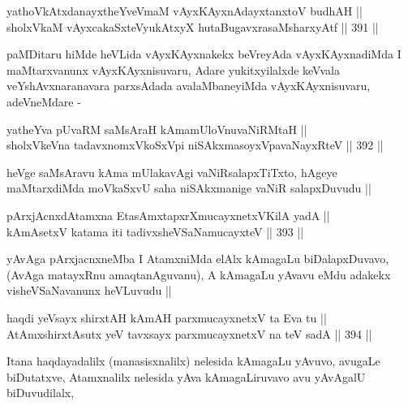 
\begin{shl}
yathoVkAtxdanayxtheYveVmaM vAyxKAyxnAdayxtanxtoV budhAH ||  \\
sholxVkaM vAyxcakaSxteV\s yukAtxyX hutaBugavxrasaMsharxyAtf ||  391 ||  
\end{shl}

\begin{artha}
paMDitaru hiMde heVLida vAyxKAyxnakekx beVreyAda vAyxKAyxnadiMda I
maMtarxvanunx vAyxKAyxnisuvaru, Adare yukitxyilalxde keVvala
veYshAvxnaranavara parxsAdada avalaMbaneyiMda vAyxKAyxnisuvaru, adeVneMdare  -
\end{artha}

\begin{shl}
yatheYva pUvaRM saMsAraH kAmamUloV\s nuvaNiRMtaH || \\
sholxVkeVna tadavxnomxVkoSxV\s pi niSAkxmasoyxVpavaNayxRteV ||  392 ||  
\end{shl}

\begin{artha}
heVge saMsAravu kAma mUlakavAgi vaNiRsalapxTiTxto, hAgeye maMtarxdiMda
moVkaSxvU saha niSAkxmanige vaNiR salapxDuvudu ||
\end{artha}


\begin{shl}
pArxjAcnxdAtamxna EtasAmxtapxrXmucayxnetxV\s KilA yadA || \\
kAmAsetxV katama iti tadivxsheVSaNamucayxteV ||  393 ||  
\end{shl}

\begin{artha}
yAvAga pArxjacnxneMba I AtamxniMda elAlx kAmagaLu biDalapxDuvavo,
(AvAga matayxRnu amaqtanAguvanu), A kAmagaLu yAvavu eMdu adakekx
visheVSaNavanunx heVLuvudu || 
\end{artha}


\begin{shl}
haqdi yeV\s sayx shirxtAH kAmAH parxmucayxnetxV ta Eva tu || \\
AtAmxshirxtAsutx yeV tavxsayx parxmucayxnetxV na teV sadA ||  394 ||  
\end{shl}

\begin{artha}
Itana haqdayadalilx (manasisxnalilx) nelesida kAmagaLu yAvuvo, avugaLe
biDutatxve, Atamxnalilx nelesida yAva kAmagaLiruvavo avu yAvAgalU
biDuvudilalx, 
\end{artha}

